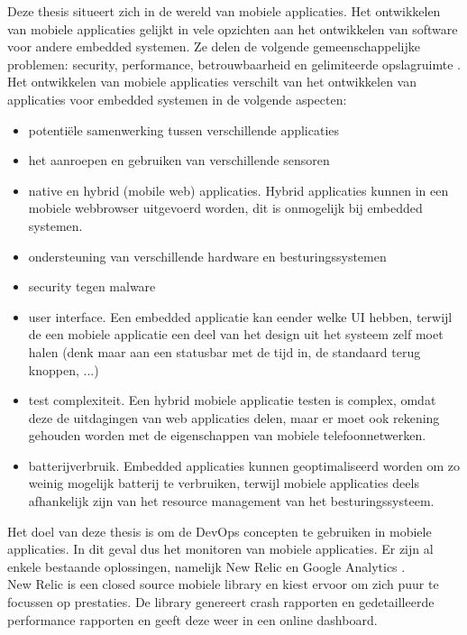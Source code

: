 Deze thesis situeert zich in de wereld van mobiele applicaties. Het ontwikkelen van mobiele applicaties gelijkt in vele opzichten aan het ontwikkelen van software voor andere embedded systemen. Ze delen de volgende gemeenschappelijke problemen: security, performance, betrouwbaarheid en gelimiteerde opslagruimte \cite{wasserman2010software}. Het ontwikkelen van mobiele applicaties verschilt van het ontwikkelen van applicaties voor embedded systemen in de volgende aspecten:
\begin{itemize}\label{Verschillen}
\item potenti\"ele samenwerking tussen verschillende applicaties
\item het aanroepen en gebruiken van verschillende sensoren
\item native en hybrid (mobile web) applicaties. Hybrid applicaties kunnen in een mobiele webbrowser uitgevoerd worden, dit is onmogelijk bij embedded systemen.
\item ondersteuning van verschillende hardware en besturingssystemen
\item security tegen malware
\item user interface. Een embedded applicatie kan eender welke UI hebben, terwijl de een mobiele applicatie een deel van het design uit het systeem zelf moet halen (denk maar aan een statusbar met de tijd in, de standaard terug knoppen, ...)
\item test complexiteit. Een hybrid mobiele applicatie testen is complex, omdat deze de uitdagingen van web applicaties delen, maar er moet ook rekening gehouden worden met de eigenschappen van mobiele telefoonnetwerken.
\item batterijverbruik. Embedded applicaties kunnen geoptimaliseerd worden om zo weinig mogelijk batterij te verbruiken, terwijl mobiele applicaties deels afhankelijk zijn van het resource management van het besturingssysteem.
\end{itemize}


Het doel van deze thesis is om de DevOps concepten te gebruiken in mobiele applicaties. In dit geval dus het monitoren van mobiele applicaties. Er zijn al enkele bestaande oplossingen, namelijk New Relic \cite{NewRelic} en Google Analytics \cite{GooAna}. \\ 

New Relic is een closed source mobiele library en kiest ervoor om zich puur te focussen op prestaties. De library genereert crash rapporten en gedetailleerde performance rapporten en geeft deze weer in een online dashboard. \\

